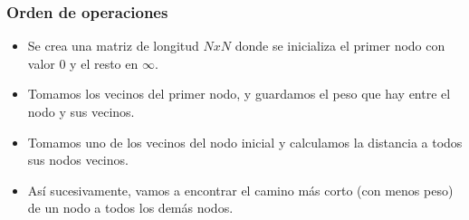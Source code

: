 \documentclass[10pt,a4paper]{article}
\begin{document}
\subsubsection*{Orden de operaciones}
\begin{itemize}
    \item Se crea una matriz de longitud $N x N$ donde se inicializa el primer nodo con valor 0 y el resto en $\infty$.
    \item Tomamos los vecinos del primer nodo, y guardamos el peso que hay entre el nodo y sus vecinos.
    \item Tomamos uno de los vecinos del nodo inicial y calculamos la distancia a todos sus nodos vecinos.
    \item Así sucesivamente, vamos a encontrar el camino más corto (con menos peso) de un nodo a todos los demás nodos.
\end{itemize}
\end{document}
